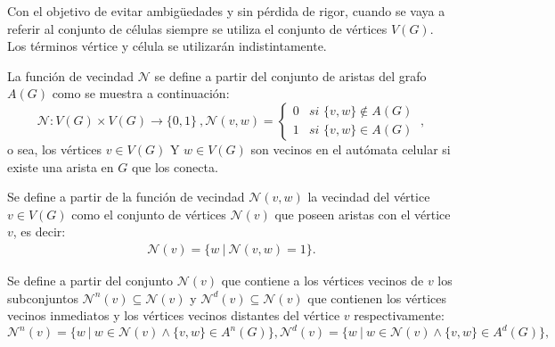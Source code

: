 Con el objetivo de evitar ambig\"uedades y sin p\'erdida de rigor, cuando se vaya a referir al conjunto de c\'elulas siempre se utiliza el conjunto de v\'ertices $V(G)$. Los t\'erminos v\'ertice y c\'elula se utilizar\'an indistintamente. 

\begin{definition} 
\label{def-N}
La funci\'on de vecindad $\mathcal{N}$ se define a partir del conjunto de aristas del grafo $A(G)$ como se muestra a continuaci\'on:
\begin{subequations}
\begin{equation}
\boxed{\mathcal{N} : V(G) \times V(G) \rightarrow \lbrace 0,1 \rbrace}~, \label{eq-N}
\end{equation}
\begin{equation}
\boxed{\mathcal{N}(v,w) = \left\lbrace
	\begin{array}{lr}
		0& \textit{si } \lbrace v,w \rbrace \notin A(G)\\
		1& \textit{si } \lbrace v,w \rbrace \in A(G)
	\end{array}
\right.}~, \label{eq-N-2}
\end{equation}
\end{subequations}
o sea, los v\'ertices $v \in V(G)$ Y $w \in V(G)$  son vecinos en el aut\'omata celular si existe una arista en $G$ que los conecta.
\end{definition}

\begin{definition}
\label{def-neighbourhood}
Se define a partir de la funci\'on de vecindad $\mathcal{N}(v,w)$ la vecindad del v\'ertice $v \in V(G)$ como el conjunto de v\'ertices $\mathcal{N}(v)$ que poseen aristas con el v\'ertice $v$, es decir:
\begin{align} 
\mathcal{N}(v) = \lbrace w~|~\mathcal{N}(v,w)=1 \rbrace. \label{eq-neighbourhood}
\end{align}
\end{definition}

\begin{definition}
\label{def-neighbourhoods}
Se define a partir del conjunto $\mathcal{N}(v)$ que contiene a los v\'ertices vecinos de $v$ los subconjuntos $\mathcal{N}^{n}(v) \subseteq \mathcal{N}(v)$ y $\mathcal{N}^{d}(v) \subseteq \mathcal{N}(v)$ que contienen los v\'ertices vecinos inmediatos y los v\'ertices vecinos distantes del v\'ertice $v$ respectivamente:
\begin{subequations}
\begin{equation}
\mathcal{N}^{n}(v) = \lbrace w~|~w \in \mathcal{N}(v) \wedge \lbrace v,w \rbrace \in A^n(G) \rbrace, \label{eq-neighbourhoods}
\end{equation}
\begin{equation}
\mathcal{N}^{d}(v) = \lbrace w~|~w \in \mathcal{N}(v) \wedge \lbrace v,w \rbrace \in A^d(G) \rbrace, \label{eq-neighbourhoods-2}
\end{equation}
\end{subequations}
\end{definition}

